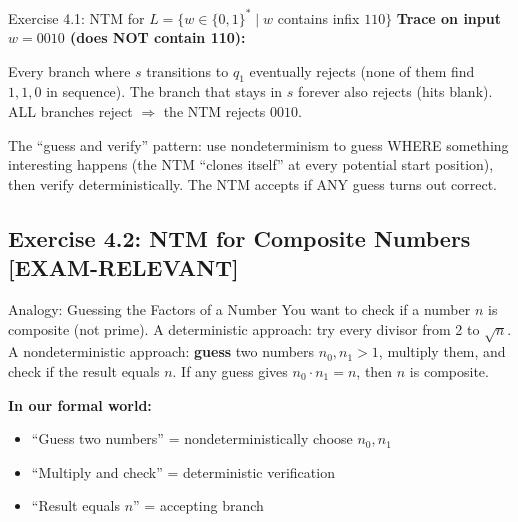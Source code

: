 \documentclass[11pt,a4paper]{article}
\newcommand{\kemark}{\textcolor{red!70!black}{\textbf{[EXAM-RELEVANT]}}}
\newcommand{\kt}[1]{\par\vspace{0.3em}\colorbox{yellow!60}{\parbox{\dimexpr\linewidth-2\fboxsep}{#1}}\vspace{0.3em}}
\begin{document}
\begin{examplebox}{{Exercise 4.1: NTM for $L = \{w \in \{0,1\}^* \mid w$ contains infix $110\}$}}
\textbf{Trace on input $w = 0010$ (does NOT contain 110):}

Every branch where $s$ transitions to $q_1$ eventually rejects (none of them find $1, 1, 0$ in sequence). The branch that stays in $s$ forever also rejects (hits blank). ALL branches reject $\Rightarrow$ the NTM rejects $0010$.

\kt{The ``guess and verify'' pattern: use nondeterminism to guess WHERE something interesting happens (the NTM ``clones itself'' at every potential start position), then verify deterministically. The NTM accepts if ANY guess turns out correct.}
\end{examplebox}

\subsection{Exercise 4.2: NTM for Composite Numbers \kemark}

\begin{notebox}{Analogy: Guessing the Factors of a Number}
You want to check if a number $n$ is composite (not prime). A deterministic approach: try every divisor from 2 to $\sqrt{n}$. A nondeterministic approach: \textbf{guess} two numbers $n_0, n_1 > 1$, multiply them, and check if the result equals $n$. If any guess gives $n_0 \cdot n_1 = n$, then $n$ is composite.

\textbf{In our formal world:}
\begin{itemize}[nosep]
\item ``Guess two numbers'' = nondeterministically choose $n_0, n_1$
\item ``Multiply and check'' = deterministic verification
\item ``Result equals $n$'' = accepting branch
\end{itemize}
\end{notebox}
\end{document}
